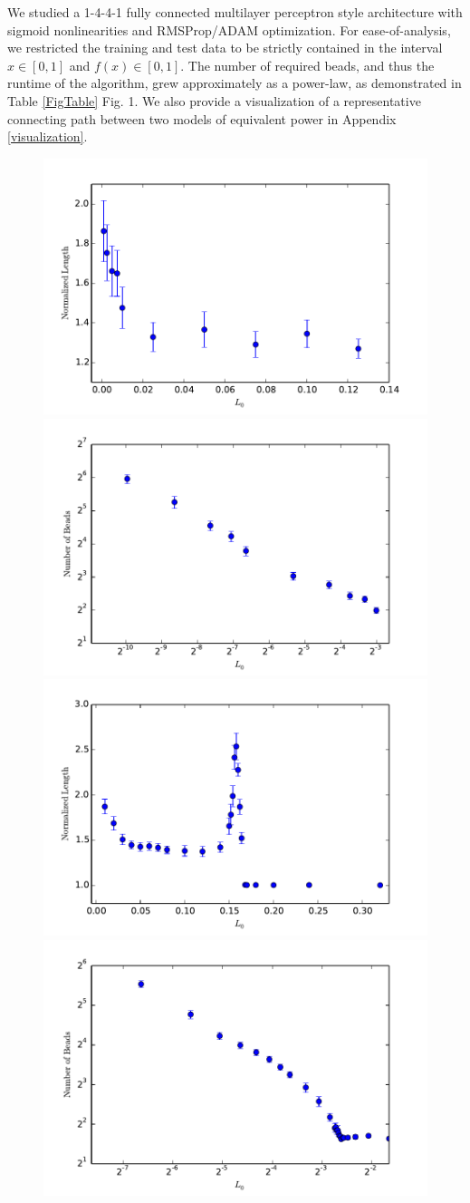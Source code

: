  We studied a 1-4-4-1 fully connected multilayer perceptron style architecture with sigmoid nonlinearities and RMSProp/ADAM optimization.  For ease-of-analysis, we restricted the training and test data to be strictly contained in the interval $x\in[0,1]$ and $f(x)\in[0,1]$.  The number of required beads, and thus the runtime of the algorithm, grew approximately as a power-law, as demonstrated in Table \ref{FigTable} Fig. 1.  We also provide a visualization of a representative connecting path between two models of equivalent power in Appendix \ref{visualization}.
 

\begin{figure} 
  \centering
  \includegraphics[width=.34\textwidth]{../Plots/normlengthquadratics}%
   \includegraphics[width=.34\textwidth]{../Plots/numbeadsquadratics} \\ %
    \includegraphics[width=.34\textwidth]{../Plots/normlengthcubics} %
    \includegraphics[width=.34\textwidth]{../Plots/numbeadscubics}\\%

\end{figure}
